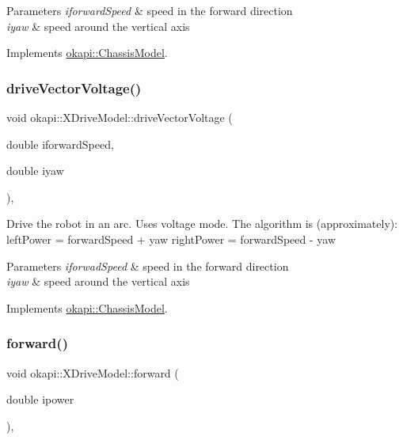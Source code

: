\begin{DoxyParams}{Parameters}
{\em iforward\+Speed} & speed in the forward direction \\
\hline
{\em iyaw} & speed around the vertical axis \\
\hline
\end{DoxyParams}


Implements \mbox{\hyperlink{classokapi_1_1ChassisModel_aa621ce62c2bc336e41b859e2cb10dda5}{okapi\+::\+Chassis\+Model}}.

\mbox{\label{classokapi_1_1XDriveModel_a2a066629991985282b8205af6b03d9f6}} 
\subsubsection{\texorpdfstring{driveVectorVoltage()}{driveVectorVoltage()}}
{\footnotesize\ttfamily void okapi\+::\+X\+Drive\+Model\+::drive\+Vector\+Voltage (\begin{DoxyParamCaption}\item[{double}]{iforward\+Speed,  }\item[{double}]{iyaw }\end{DoxyParamCaption})\hspace{0.3cm}{\ttfamily [override]}, {\ttfamily [virtual]}}

Drive the robot in an arc. Uses voltage mode. The algorithm is (approximately)\+: left\+Power = forward\+Speed + yaw right\+Power = forward\+Speed -\/ yaw


\begin{DoxyParams}{Parameters}
{\em iforwad\+Speed} & speed in the forward direction \\
\hline
{\em iyaw} & speed around the vertical axis \\
\hline
\end{DoxyParams}


Implements \mbox{\hyperlink{classokapi_1_1ChassisModel_a69115758be9e29888dce34f317d57150}{okapi\+::\+Chassis\+Model}}.

\mbox{\label{classokapi_1_1XDriveModel_a2a26c9bd57c26ca0251040a14272226c}} 
\subsubsection{\texorpdfstring{forward()}{forward()}}
{\footnotesize\ttfamily void okapi\+::\+X\+Drive\+Model\+::forward (\begin{DoxyParamCaption}\item[{double}]{ipower }\end{DoxyParamCaption})\hspace{0.3cm}{\ttfamily [override]}, {\ttfamily [virtual]}}

